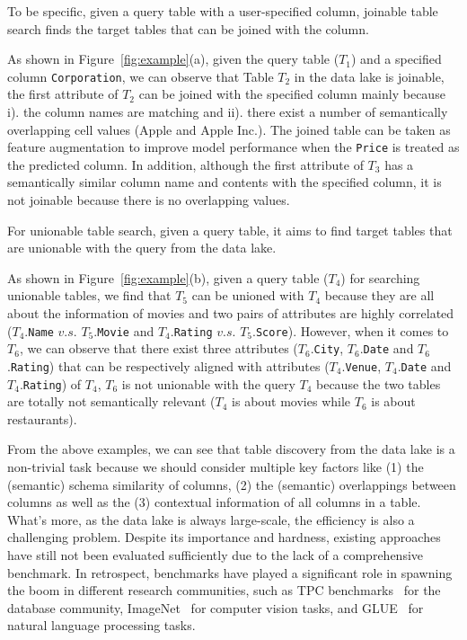 To be specific, given a query table with a user-specified column, joinable table search finds the target tables that can be joined with the column.

\begin{example}
	As shown in Figure~\ref{fig:example}(a), given the query table ($T_1$) and a specified column \texttt{Corporation},  
	we can observe that Table $T_2$ in the data lake is joinable, \ie the first attribute of $T_2$ can be joined with the specified column mainly because i). the column names are  matching  and 
	ii). there exist a number of semantically overlapping cell values (\eg Apple and Apple Inc.). 
	The joined table can be taken as feature augmentation to improve model performance when  the \texttt{Price} is treated as the predicted column. 
	In addition, although the first attribute of $T_3$ has a semantically similar column name and contents  with the specified column, it is not joinable because there is no overlapping values.
\end{example}

 For unionable table search, given a query table, it aims to find target tables that are unionable with the query from the data lake.                  
 
 \begin{example}
 	As shown in Figure~\ref{fig:example}(b), given a query table ($T_4$)  for searching unionable tables, we find that  $T_5$ can be unioned with $T_4$ because they are all about the information of movies and  two pairs of attributes are highly correlated ($T_4$.\texttt{Name} $v.s.$ $T_5$.\texttt{Movie} and $T_4$.\texttt{Rating} $v.s.$ $T_5$.\texttt{Score}). 
 	However, when it comes to $T_6$, we can observe that there exist three attributes ($T_6$.\texttt{City}, $T_6$.\texttt{Date} and $T_6$.\texttt{Rating}) that can be respectively aligned with attributes ($T_4$.\texttt{Venue}, $T_4$.\texttt{Date} and $T_4$.\texttt{Rating}) of $T_4$,  $T_6$ is not unionable with the query $T_4$ because the two tables are totally not semantically relevant ($T_4$ is about movies while $T_6$ is about restaurants).
 \end{example}






From the above examples, we can see that table discovery from the data lake is a non-trivial task because we should consider multiple key factors like (1) the (semantic) schema similarity of columns, (2) the (semantic) overlappings between columns as well as the (3) contextual information of all columns in a table.
What's more, as the data lake is always large-scale, the efficiency is also a challenging problem. Despite its importance and hardness, existing approaches have still not been evaluated  sufficiently due to the lack of a comprehensive benchmark.  In retrospect, benchmarks have played a significant role
in spawning the boom in different research communities, such as
TPC benchmarks~\cite{} for the database community, ImageNet~\cite{} for computer vision tasks, and GLUE~\cite{} for natural language processing tasks.



